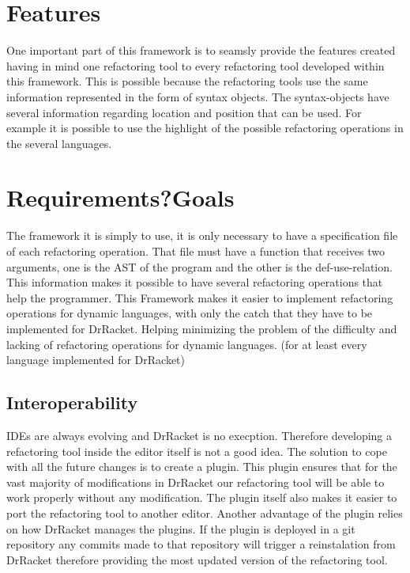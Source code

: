 \section{Features} %
One important part of this framework is to seamsly provide the features created
having in mind one refactoring tool to every refactoring tool developed within this
framework.
This is possible because the refactoring tools use the same information represented
in the form of syntax objects. The syntax-objects have several information regarding
location and position that can be used.
For example it is possible to use the highlight of the possible refactoring operations
in the several languages.

\section{Requirements?Goals}
The framework it is simply to use, it is only necessary to have a specification file
of each refactoring operation.
That file must have a function that receives two arguments,
one is the AST of the program and the other is the def-use-relation.
This information makes it possible to have several refactoring operations that help
the programmer.
This Framework makes it easier to implement refactoring operations for dynamic languages,
with only the catch that they have to be implemented for DrRacket. Helping minimizing
the problem of the difficulty and lacking of refactoring operations for dynamic languages.
(for at least every language implemented for DrRacket)




\subsection{Interoperability} %

IDEs are always evolving and DrRacket is no execption. Therefore developing a refactoring tool
inside the editor itself is not a good idea. The solution to cope with all the future changes
is to create a plugin. This plugin ensures that for the vast majority of modifications in DrRacket
our refactoring tool will be able to work properly without any modification.
The plugin itself also makes it easier to port the refactoring tool to another editor.
Another advantage of the plugin relies on how DrRacket manages the plugins. If the plugin
is deployed in a git repository any commits made to that repository will trigger
a reinstalation from DrRacket therefore providing the most updated version of the refactoring tool.

